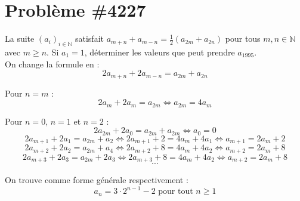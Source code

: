 \documentclass[12pt]{article}
\begin{document}
\section*{Problème \#4227}

La suite $(a_i)_{i \in \mathbb{N}}$ satisfait $a_{m+n} + a_{m-n} = \frac{1}{2}(a_{2m}+a_{2n})$ pour tous $m, n \in \mathbb{N}$ avec $m \geq n$. 
Si $a_1 = 1$, déterminer les valeurs que peut prendre $a_{1995}$. \\

On change la formule en : 
$$2a_{m+n} + 2a_{m-n} = a_{2m} + a_ {2n}$$

Pour $n=m$ : $$2a_{m} + 2a_{m} = a_{2m}  \iff \boxed{a_{2m} = 4a_{m}}$$

Pour $n=0$, $n=1$ et $n=2$ :
$$2a_{2m} + 2a_{0} = a_{2m} + a_{2m} \iff \boxed{a_0 = 0}$$
$$2a_{m+1} + 2a_{1} = a_{2m} + a_{2} \iff 2a_{m+1} + 2 = 4a_{m} + 4a_1 \iff \boxed{a_{m+1} = 2a_{m} + 2}$$
$$2a_{m+2} + 2a_{2} = a_{2m} + a_{4} \iff 2a_{m+2} + 8 = 4a_{m} + 4a_2 \iff \boxed{a_{m+2} = 2a_{m} + 8}$$
$$2a_{m+3} + 2a_{3} = a_{2m} + 2a_{3} \iff 2a_{m+3} + 8 = 4a_{m} + 4a_2 \iff \boxed{a_{m+2} = 2a_{m} + 8}$$
$$\cdots$$

On trouve comme forme générale respectivement : 
$$a_n = 3\cdot2^{n-1}-2 \text{ pour tout } n \ge 1$$
\end{document}
